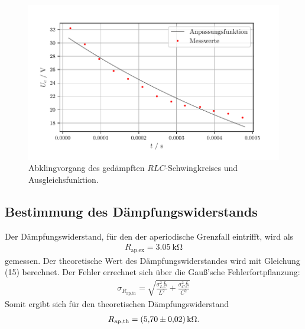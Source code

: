 \begin{figure}[H]
  \centering
  \includegraphics{plota.pdf}
  \caption{Abklingvorgang des gedämpften $\mathit{RLC}$-Schwingkreises und Ausgleichsfunktion.}
  \label{fig:Plot a}
\end{figure}

\subsection{Bestimmung des Dämpfungswiderstands }
Der Dämpfungswiderstand, für den der aperiodische Grenzfall eintrifft, wird als 
\begin{align*}
R_\text{ap,ex} = \SI{3,05}{\kilo\ohm}
\end{align*}
gemessen.
Der theoretische Wert des Dämpfungswiderstandes wird mit Gleichung (15) berechnet.
Der Fehler errechnet sich über die Gauß'sche Fehlerfortpflanzung:
\begin{align*}
\sigma_{R_\text{ap,th}} = \sqrt{\frac{\sigma_{L}^{2}\frac{L}{C}}{L^{2}} + \frac{\sigma_{C}^{2} \frac{L}{C}}{C^{2}}}
\end{align*}
Somit ergibt sich für den theoretischen Dämpfungswiderstand
\begin{align*}
R_\text{ap,th} = \SI{5.7 \pm 0.02}{\kilo\ohm}.
\end{align*}

